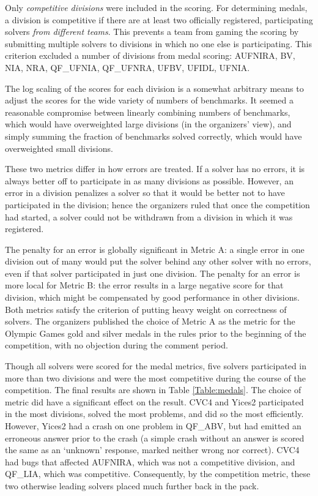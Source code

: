 \documentclass[twoside,11pt]{article}
\begin{document}
Only \textit{competitive divisions} were included in the scoring. For determining medals, a division is competitive if there are at least two officially registered, participating solvers \textit{from different teams}. This prevents a team from gaming the scoring by submitting multiple solvers to divisions in which no one else is participating. This criterion excluded a number of divisions from medal scoring: AUFNIRA, BV, NIA, NRA, QF\_UFNIA, QF\_UFNRA, UFBV, UFIDL, UFNIA.

The log scaling of the scores for each division is a somewhat arbitrary means to adjust the scores for the wide variety of numbers of benchmarks. It seemed a reasonable compromise between linearly combining numbers of benchmarks, which would have overweighted large divisions (in the organizers' view), and simply summing the fraction of benchmarks solved correctly, which would have overweighted small divisions.

These two metrics differ in how errors are treated. If a solver has no errors, it is always better off to participate in as many divisions as possible. However, an error in a division penalizes a solver so that it would be better not to have participated in the division; hence the organizers ruled that once the competition had started, a solver could not be withdrawn from a division in which it was registered.

The penalty for an error is globally significant in Metric A: a single error in one division out of many would put the solver behind any other solver with no errors, even if that solver participated in just one division. The penalty for an error is more local for Metric B: the error results in a large negative score for that division, which might be compensated by good performance in other divisions. Both metrics satisfy the criterion of putting heavy weight on correctness of solvers.
The organizers published the choice of Metric A as the metric for the Olympic Games gold and silver medals in the rules prior to the beginning of the competition, with no objection during the comment period.

Though all solvers were scored for the medal metrics, five solvers participated in more than two divisions and were the most competitive during the course of the competition. The final results are shown in Table \ref{Table:medals}. The choice of metric did have a significant effect on the result. CVC4 and Yices2 participated in the most divisions, solved the most problems, and did so the most efficiently. However, Yices2 had a crash on one problem in QF\_ABV, but had emitted an erroneous answer prior to the crash (a simple crash without an answer is scored the same as an `unknown' response, marked neither wrong nor correct). CVC4 had bugs that affected AUFNIRA, which was not a competitive division, and QF\_LIA,
which was competitive. Consequently, by the competition metric, these two otherwise leading solvers placed much further back in the pack.
\end{document}
